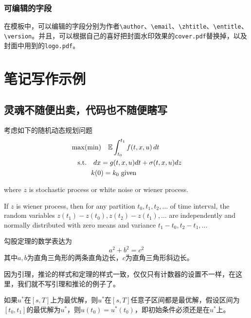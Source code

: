 \documentclass[cyan]{elegantnote}
\begin{document}
\subsection{可编辑的字段}
在模板中，可以编辑的字段分别为作者\verb|\author|、\verb|\email|、\verb|\zhtitle|、\verb|\entitle|、\verb|\version|。并且，可以根据自己的喜好把封面水印效果的\verb|cover.pdf|替换掉，以及封面中用到的\verb|logo.pdf|。

\chapter{笔记写作示例}

\section{灵魂不随便出卖，代码也不随便瞎写}
\lipsum[3]
考虑如下的随机动态规划问题
\begin{align*}
&\max(\min)\quad \mathbb{E}\int_{t_0}^{t_1}f(t,x,u)\,dt\\
&\quad\mbox{s.t.} \quad dx=g(t,x,u)dt+\sigma(t,x,u)dz\\
&\quad \hspace{2.em} k(0)=k_0\;\text{given}
\end{align*}

where $z$ is stochastic process or white noise or wiener process.

\begin{newdef}
If $z$ is wiener process, then for any partition $t_0,t_1,t_2,\ldots$ of time interval, the random variables $z(t_1)-z(t_0),z(t_2)-z(t_1),\ldots$ are independently and normally distributed with zero means and variance $t_1-t_0,t_2-t_1,\ldots$
\end{newdef}

\lipsum[1-2]

\begin{newthem}[勾股定理]
勾股定理的数学表达为
\[a^2+b^2=c^2\]
其中$a,b$为直角三角形的两条直角边长，$c$为直角三角形斜边长。
\end{newthem}

\begin{note}
因为引理，推论的样式和定理的样式一致，仅仅只有计数器的设置不一样，在这里，我们就不写引理和推论的例子了。
\end{note}


\lipsum[4]

\begin{newprop}[最优性原理]
如果$u^*$在$[s,T]$上为最优解，则$u^*$在$[s,T]$任意子区间都是最优解，假设区间为$[t_0,t_1]$的最优解为$u^*$，则$u(t_0)=u^{*}(t_0)$，即初始条件必须还是在$u^*$上。
\end{newprop}
\end{document}
